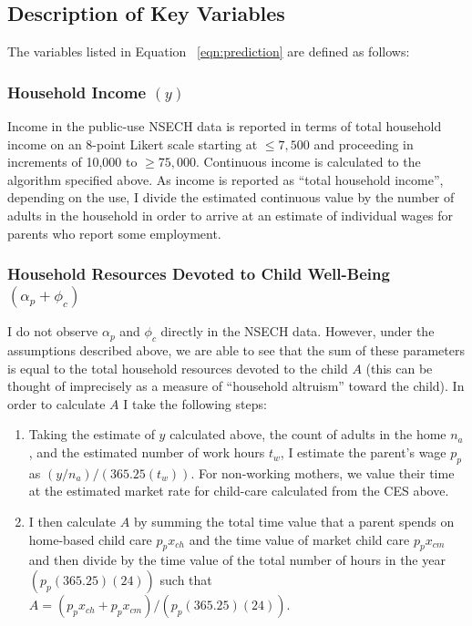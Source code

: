 \documentclass[1p, review]{elsarticle}\usepackage[]{graphicx}\usepackage[]{color}
\begin{document}
\subsection{Description of Key Variables}







The variables listed in Equation ~\ref{eqn:prediction} are defined as follows:

\subsubsection{Household Income $(y)$}

Income in the public-use NSECH data is reported in terms of total household income on an 8-point Likert scale starting at $\le 7,500$ and proceeding in increments of 10,000 to $\ge 75,000$. Continuous income is calculated to the algorithm specified above. As income is reported as ``total household income'', depending on the use, I divide the estimated continuous value by the number of adults in the household in order to arrive at an estimate of individual wages for parents who report some employment.    

\subsubsection{Household Resources Devoted to Child Well-Being $(\alpha_p + \phi_c)$}

I do not observe $\alpha_p$ and $\phi_c$ directly in the NSECH data. However, under the assumptions described above, we are able to see that the sum of these parameters is equal to the total household resources devoted to the child $A$ (this can be thought of imprecisely as a measure of ``household altruism'' toward the child). In order to calculate $A$ I take the following steps: 

\begin{enumerate}
  \item Taking the estimate of $y$ calculated above, the count of adults in the home $n_a$, and the estimated number of work hours $t_w$, I estimate the parent's wage $p_p$ as $(y/n_a)/(365.25(t_w))$. For non-working mothers, we value their time at the estimated market rate for child-care calculated from the CES above.   
  \item I then calculate $A$ by summing the total time value that a parent spends on home-based child care $p_px_{ch}$ and the time value of market child care $p_px_{cm}$ and then divide by the time value of the total number of hours in the year $(p_p(365.25)(24))$ such that $A=(p_px_{ch}+p_px_{cm})/(p_p(365.25)(24))$.
\end{enumerate}
\end{document}
